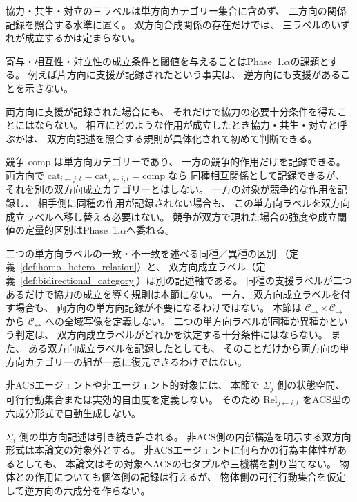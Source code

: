 \begin{remark}[協力・共生・対立の双方向性]
\label{rem:cooperation_bidirectional}
協力・共生・対立の三ラベルは単方向カテゴリー集合に含めず、
二方向の関係記録を照合する水準に置く。
双方向合成関係の存在だけでは、
三ラベルのいずれが成立するかは定まらない。

寄与・相互性・対立性の成立条件と閾値を与えることはPhase~1.$\alpha$の課題とする。
例えば片方向に支援が記録されたという事実は、
逆方向にも支援があることを示さない。

両方向に支援が記録された場合にも、
それだけで協力の必要十分条件を得たことにはならない。
相互にどのような作用が成立したとき協力・共生・対立と呼ぶかは、
双方向記述を照合する規則が具体化されて初めて判断できる。
\end{remark}

\begin{remark}[競争の方向性に関する特殊性]
\label{rem:competition_directionality}
競争 $\mathrm{comp}$ は単方向カテゴリーであり、
一方の競争的作用だけを記録できる。
両方向で $\mathrm{cat}_{i\leftarrow j,t}=\mathrm{cat}_{j\leftarrow i,t}=\mathrm{comp}$ なら
同種相互関係として記録できるが、
それを別の双方向成立カテゴリーとはしない。
一方の対象が競争的な作用を記録し、
相手側に同種の作用が記録されない場合も、
この単方向ラベルを双方向成立ラベルへ移し替える必要はない。
競争が双方で現れた場合の強度や成立閾値の定量的区別はPhase~1.$\alpha$へ委ねる。
\end{remark}

\begin{remark}[双方向成立カテゴリーと同種相互関係の関係]
\label{rem:bidirect_vs_homo}
二つの単方向ラベルの一致・不一致を述べる同種／異種の区別
（定義~\ref{def:homo_hetero_relation}）と、
双方向成立ラベル（定義~\ref{def:bidirectional_category}）は別の記述軸である。
同種の支援ラベルが二つあるだけで協力の成立を導く規則は本節にない。
一方、
双方向成立ラベルを付す場合も、
両方向の単方向記録が不要になるわけではない。
本節は $\mathcal C_{\rightarrow}\times\mathcal C_{\rightarrow}$ から
$\mathcal C_{\leftrightarrow}$ への全域写像を定義しない。
二つの単方向ラベルが同種か異種かという判定は、
双方向成立ラベルがどれかを決定する十分条件にはならない。
また、
ある双方向成立ラベルを記録したとしても、
そのことだけから両方向の単方向カテゴリーの組が一意に復元できるわけではない。
\end{remark}

\begin{remark}[非ACS対象との双方向関係の制限]
\label{rem:nACS_limit}
非ACSエージェントや非エージェント的対象には、
本節で $\Sigma_j$ 側の状態空間、
可行行動集合または実効的自由度を定義しない。
そのため $\mathrm{Rel}_{j\leftarrow i,t}$ をACS型の六成分形式で自動生成しない。

$\Sigma_i$ 側の単方向記述は引き続き許される。
非ACS側の内部構造を明示する双方向形式は本論文の対象外とする。
非ACSエージェントに何らかの行為主体性があるとしても、
本論文はその対象へACSの七タプルや三機構を割り当てない。
物体との作用についても個体側の記録は行えるが、
物体側の可行行動集合を仮定して逆方向の六成分を作らない。
\end{remark}

